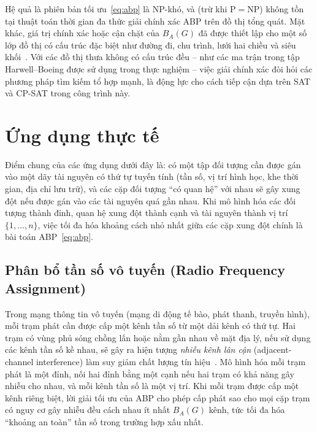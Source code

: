 \documentclass[a4paper,fleqn]{cas-sc}
\begin{document}
Hệ quả là phiên bản tối ưu~\eqref{eq:abp} là NP-khó, và (trừ khi $\mathrm{P} = \mathrm{NP}$) không tồn tại thuật toán thời gian đa thức giải chính xác ABP trên đồ thị tổng quát. Mặt khác, giá trị chính xác hoặc cận chặt của $B_A(G)$ đã được thiết lập cho một số lớp đồ thị có cấu trúc đặc biệt như đường đi, chu trình, lưới hai chiều và siêu khối~\cite{raspaud2009}. Với các đồ thị thưa không có cấu trúc đều -- như các ma trận trong tập Harwell--Boeing được sử dụng trong thực nghiệm -- việc giải chính xác đòi hỏi các phương pháp tìm kiếm tổ hợp mạnh, là động lực cho cách tiếp cận dựa trên SAT và CP-SAT trong công trình này.

\section{Ứng dụng thực tế}
\label{sec:applications}
Điểm chung của các ứng dụng dưới đây là: có một tập đối tượng cần được gán vào một dãy tài nguyên có thứ tự tuyến tính (tần số, vị trí hình học, khe thời gian, địa chỉ lưu trữ), và các cặp đối tượng ``có quan hệ'' với nhau sẽ gây xung đột nếu được gán vào các tài nguyên quá gần nhau. Khi mô hình hóa các đối tượng thành đỉnh, quan hệ xung đột thành cạnh và tài nguyên thành vị trí $\{1, \dots, n\}$, việc tối đa hóa khoảng cách nhỏ nhất giữa các cặp xung đột chính là bài toán ABP~\eqref{eq:abp}.

\subsection{Phân bổ tần số vô tuyến (Radio Frequency Assignment)}
Trong mạng thông tin vô tuyến (mạng di động tế bào, phát thanh, truyền hình), mỗi trạm phát cần được cấp một kênh tần số từ một dải kênh có thứ tự. Hai trạm có vùng phủ sóng chồng lấn hoặc nằm gần nhau về mặt địa lý, nếu sử dụng các kênh tần số kề nhau, sẽ gây ra hiện tượng \emph{nhiễu kênh lân cận} (adjacent-channel interference) làm suy giảm chất lượng tín hiệu~\cite{hale1980}. Mô hình hóa mỗi trạm phát là một đỉnh, nối hai đỉnh bằng một cạnh nếu hai trạm có khả năng gây nhiễu cho nhau, và mỗi kênh tần số là một vị trí. Khi mỗi trạm được cấp một kênh riêng biệt, lời giải tối ưu của ABP cho phép cấp phát sao cho mọi cặp trạm có nguy cơ gây nhiễu đều cách nhau ít nhất $B_A(G)$ kênh, tức tối đa hóa ``khoảng an toàn'' tần số trong trường hợp xấu nhất.
\end{document}
